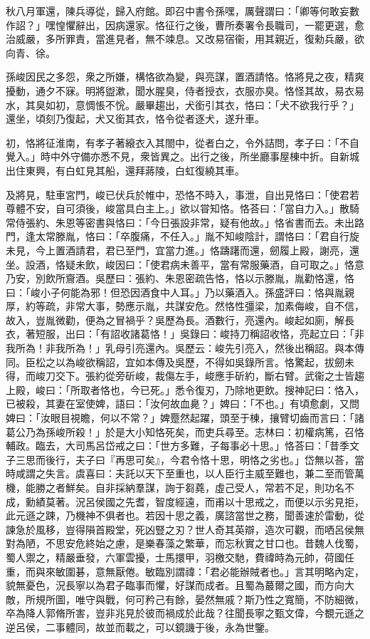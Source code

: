 \begin{pinyinscope}
秋八月軍還，陳兵導從，歸入府館。即召中書令孫嘿，厲聲謂曰：「卿等何敢妄數作詔？」嘿惶懼辭出，因病還家。恪征行之後，曹所奏署令長職司，一罷更選，愈治威嚴，多所罪責，當進見者，無不竦息。又改易宿衞，用其親近，復勑兵嚴，欲向青、徐。

孫峻因民之多怨，衆之所嫌，構恪欲為變，與亮謀，置酒請恪。恪將見之夜，精爽擾動，通夕不寐。明將盥漱，聞水腥臭，侍者授衣，衣服亦臭。恪怪其故，易衣易水，其臭如初，意惆悵不恱。嚴畢趨出，犬銜引其衣，恪曰：「犬不欲我行乎？」還坐，頃刻乃復起，犬又銜其衣，恪令從者逐犬，遂升車。

初，恪將征淮南，有孝子著縗衣入其閤中，從者白之，令外詰問，孝子曰：「不自覺入。」時中外守備亦悉不見，衆皆異之。出行之後，所坐廳事屋棟中折。自新城出住東興，有白虹見其船，還拜蔣陵，白虹復繞其車。

及將見，駐車宮門，峻已伏兵於帷中，恐恪不時入，事泄，自出見恪曰：「使君若尊體不安，自可須後，峻當具白主上。」欲以甞知恪。恪荅曰：「當自力入。」散騎常侍張約、朱恩等密書與恪曰：「今日張設非常，疑有他故。」恪省書而去。未出路門，逢太常滕胤，恪曰：「卒腹痛，不任入。」胤不知峻陰計，謂恪曰：「君自行旋未見，今上置酒請君，君已至門，宜當力進。」恪躊躇而還，劒履上殿，謝亮，還坐。設酒，恪疑未飲，峻因曰：「使君病未善平，當有常服藥酒，自可取之。」恪意乃安，別飲所齎酒。吳歷曰：張約、朱恩密疏告恪，恪以示滕胤，胤勸恪還，恪曰：「峻小子何能為邪！但恐因酒食中人耳。」乃以藥酒入。孫盛評曰：恪與胤親厚，約等疏，非常大事，勢應示胤，共謀安危。然恪性彊梁，加素侮峻，自不信，故入，豈胤微勸，便為之冒禍乎？吳歷為長。酒數行，亮還內。峻起如廁，解長衣，著短服，出曰：「有詔收諸葛恪！」吳錄曰：峻持刀稱詔收恪，亮起立曰：「非我所為！非我所為！」乳母引亮還內。吳歷云：峻先引亮入，然後出稱詔。與本傳同。臣松之以為峻欲稱詔，宜如本傳及吳歷，不得如吳錄所言。恪驚起，拔劒未得，而峻刀交下。張約從旁斫峻，裁傷左手，峻應手斫約，斷右臂。武衞之士皆趨上殿，峻曰：「所取者恪也，今已死。」悉令復刃，乃除地更飲。搜神記曰：恪入，已被殺，其妻在室使婢，語曰：「汝何故血臰？」婢曰：「不也。」有頃愈劇，又問婢曰：「汝眼目視瞻，何以不常？」婢蹷然起躍，頭至于棟，攘臂切齒而言曰：「諸葛公乃為孫峻所殺！」於是大小知恪死矣，而吏兵尋至。志林曰：初權病篤，召恪輔政。臨去，大司馬呂岱戒之曰：「世方多難，子每事必十思。」恪荅曰：「昔季文子三思而後行，夫子曰『再思可矣』，今君令恪十思，明恪之劣也。」岱無以荅，當時咸謂之失言。虞喜曰：夫託以天下至重也，以人臣行主威至難也，兼二至而管萬機，能勝之者鮮矣。自非採納羣謀，詢于芻蕘，虛己受人，常若不足，則功名不成，勳績莫著。況呂侯國之先耆，智度經遠，而甫以十思戒之，而便以示劣見拒，此元遜之踈，乃機神不俱者也。若因十思之義，廣諮當世之務，聞善速於雷動，從諫急於風移，豈得隕首殿堂，死凶豎之刃？世人奇其英辯，造次可觀，而哂呂侯無對為陋，不思安危終始之慮，是樂春藻之繁華，而忘秋實之甘口也。昔魏人伐蜀，蜀人禦之，精嚴垂發，六軍雲擾，士馬擐甲，羽檄交馳，費禕時為元帥，荷國任重，而與來敏圍碁，意無厭倦。敏臨別謂禕：「君必能辦賊者也。」言其明略內定，貌無憂色，況長寧以為君子臨事而懼，好謀而成者。且蜀為蕞爾之國，而方向大敵，所規所圖，唯守與戰，何可矜己有餘，晏然無戚？斯乃性之寬簡，不防細微，卒為降人郭脩所害，豈非兆見於彼而禍成於此哉？往聞長寧之甄文偉，今覩元遜之逆呂侯，二事體同，故並而載之，可以鏡譏于後，永為世鑒。


\end{pinyinscope}
